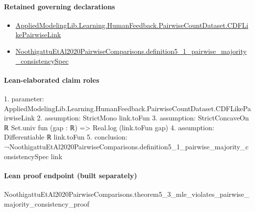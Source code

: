 \documentclass[10pt]{article}
\begin{document}
\paragraph{Retained governing declarations}
\begin{itemize}\raggedright
\item \hyperlink{governing-declaration-3449f3559185d0fd}{Applied\allowbreak{}Modeling\allowbreak{}Lib.\allowbreak{}Learning.\allowbreak{}Human\allowbreak{}Feedback.\allowbreak{}Pairwise\allowbreak{}Count\allowbreak{}Dataset.\allowbreak{}CDF\allowbreak{}Like\allowbreak{}Pairwise\allowbreak{}Link}
\item \hyperlink{paper-prerequisite-0eba3734667d4efb}{Noothigattu\allowbreak{}Et\allowbreak{}Al2020\allowbreak{}Pairwise\allowbreak{}Comparisons.\allowbreak{}definition5\_\allowbreak{}1\_\allowbreak{}pairwise\_\allowbreak{}majority\_\allowbreak{}consistency\allowbreak{}Spec}
\end{itemize}
\paragraph{Lean-elaborated claim roles}\begin{ReviewVerbatim}
1. parameter: AppliedModelingLib.Learning.HumanFeedback.PairwiseCountDataset.CDFLikePairwiseLink
2. assumption: StrictMono link.toFun
3. assumption: StrictConcaveOn ℝ Set.univ fun (gap : ℝ) => Real.log (link.toFun gap)
4. assumption: Differentiable ℝ link.toFun
5. conclusion: ¬NoothigattuEtAl2020PairwiseComparisons.definition5_1_pairwise_majority_consistencySpec link
\end{ReviewVerbatim}

\paragraph{Lean proof endpoint (built separately)}\begin{ReviewVerbatim}
NoothigattuEtAl2020PairwiseComparisons.theorem5_3_mle_violates_pairwise_majority_consistency_proof
\end{ReviewVerbatim}
\end{document}
